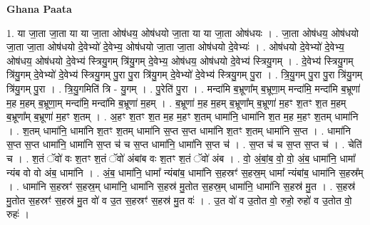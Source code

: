 \documentclass[17pt]{extarticle}
\begin{document}
\textbf{Ghana Paata } \newline

1. या जा॒ता जा॒ता या या जा॒ता ओष॑धय॒ ओष॑धयो जा॒ता या या जा॒ता ओष॑धयः । . जा॒ता ओष॑धय॒ ओष॑धयो जा॒ता जा॒ता ओष॑धयो दे॒वेभ्यो॑ दे॒वेभ्य॒ ओष॑धयो जा॒ता जा॒ता ओष॑धयो दे॒वेभ्यः॑ । . ओष॑धयो दे॒वेभ्यो॑ दे॒वेभ्य॒ ओष॑धय॒ ओष॑धयो दे॒वेभ्य॑ स्त्रियु॒गम् त्रि॑यु॒गम् दे॒वेभ्य॒ ओष॑धय॒ ओष॑धयो दे॒वेभ्य॑ स्त्रियु॒गम् । . दे॒वेभ्य॑ स्त्रियु॒गम् त्रि॑यु॒गम् दे॒वेभ्यो॑ दे॒वेभ्य॑ स्त्रियु॒गम् पु॒रा पु॒रा त्रि॑यु॒गम् दे॒वेभ्यो॑ दे॒वेभ्य॑ स्त्रियु॒गम् पु॒रा । . त्रि॒यु॒गम् पु॒रा पु॒रा त्रि॑यु॒गम् त्रि॑यु॒गम् पु॒रा । . त्रि॒यु॒गमिति॑ त्रि - यु॒गम् । . पु॒रेति॑ पु॒रा । . मन्दा॑मि ब॒भ्रूणा᳚म् ब॒भ्रूणा॒म् मन्दा॑मि॒ मन्दा॑मि ब॒भ्रूणा॑ म॒ह म॒हम् ब॒भ्रूणा॒म् मन्दा॑मि॒ मन्दा॑मि ब॒भ्रूणा॑ म॒हम् । . ब॒भ्रूणा॑ म॒ह म॒हम् ब॒भ्रूणा᳚म् ब॒भ्रूणा॑ म॒हꣳ श॒तꣳ श॒त म॒हम् ब॒भ्रूणा᳚म् ब॒भ्रूणा॑ म॒हꣳ श॒तम् । . अ॒हꣳ श॒तꣳ श॒त म॒ह म॒हꣳ श॒तम् धामा॑नि॒ धामा॑नि श॒त म॒ह म॒हꣳ श॒तम् धामा॑नि । . श॒तम् धामा॑नि॒ धामा॑नि श॒तꣳ श॒तम् धामा॑नि स॒प्त स॒प्त धामा॑नि श॒तꣳ श॒तम् धामा॑नि स॒प्त । . धामा॑नि स॒प्त स॒प्त धामा॑नि॒ धामा॑नि स॒प्त च॑ च स॒प्त धामा॑नि॒ धामा॑नि स॒प्त च॑ । . स॒प्त च॑ च स॒प्त स॒प्त च॑ । . चेति॑ च । . श॒तं ॅवो॑ वः श॒तꣳ श॒तं ॅवो॑ अंबांब वः श॒तꣳ श॒तं ॅवो॑ अंब । . वो॒ अं॒बां॒ब॒ वो॒ वो॒ अं॒ब॒ धामा॑नि॒ धामा᳚ न्यंब वो वो अंब॒ धामा॑नि । . अं॒ब॒ धामा॑नि॒ धामा᳚ न्यंबांब॒ धामा॑नि स॒हस्रꣳ॑ स॒हस्र॒म् धामा᳚ न्यंबांब॒ धामा॑नि स॒हस्र᳚म् । . धामा॑नि स॒हस्रꣳ॑ स॒हस्र॒म् धामा॑नि॒ धामा॑नि स॒हस्र॑ मु॒तोत स॒हस्र॒म् धामा॑नि॒ धामा॑नि स॒हस्र॑ मु॒त । . स॒हस्र॑ मु॒तोत स॒हस्रꣳ॑ स॒हस्र॑ मु॒त वो॑ व उ॒त स॒हस्रꣳ॑ स॒हस्र॑ मु॒त वः॑ । . उ॒त वो॑ व उ॒तोत वो॒ रुहो॒ रुहो॑ व उ॒तोत वो॒ रुहः॑ । \newline
\end{document}
